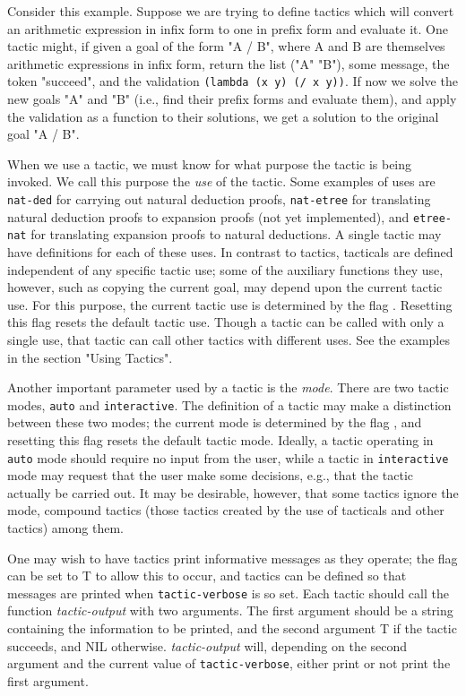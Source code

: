 Consider this example.  Suppose we are trying to define tactics which
will convert an arithmetic expression in infix form to one in
prefix form and evaluate it.  One tactic might,
if given a goal of the form "A / B", where A and B are themselves 
arithmetic expressions in infix form, return the list ("A" "B"),
some message, the token "succeed", and the 
validation {\tt (lambda (x y) (/ x y))}.  If now we solve the new goals "A"
and "B" (i.e., find their prefix forms and evaluate them),
and apply the validation as a function to their solutions, we get
a solution to the original goal "A / B".

When we use a tactic, we must know for what purpose the tactic is being
invoked.  We call this purpose the {\it use} of the tactic.  Some examples
of uses are {\tt nat-ded} for carrying out natural deduction proofs, {\tt nat-etree}
for translating natural deduction proofs to expansion proofs (not yet implemented), and {\tt etree-nat}
for translating expansion proofs to natural deductions.  A single tactic may
have definitions for each of these uses.  In contrast to tactics, tacticals
are defined independent of any specific tactic use; some of the auxiliary
functions they use, however, such as copying the current goal, may depend
upon the current tactic use.  For this purpose, the current tactic use
is determined by the flag .  Resetting this flag resets
the default tactic use. Though a tactic can be called
with only a single use, that tactic can call other tactics with different
uses.  See the examples in the section "Using Tactics".

Another important parameter used by a tactic is the {\it mode}.  There are
two tactic modes, {\tt auto} and {\tt interactive}.  The definition of
a tactic may make a distinction between these two modes; the current
mode is determined by the flag  , and resetting this
flag resets the default tactic mode.  Ideally, a tactic
operating in {\tt auto} mode should require no input from the user, while
a tactic in {\tt interactive} mode may request that the user make some decisions,
e.g., that the tactic actually be carried out.  It may be desirable, however,
that some tactics ignore the mode, compound tactics (those tactics created
by the use of tacticals and other tactics) among them.

One may wish to have tactics print informative messages as they operate;
the flag  can be set to T to allow this to
occur, and tactics can be defined so that messages are printed when
{\tt tactic-verbose} is so set. Each tactic should call the function {\it tactic-output} 
with two arguments. The first argument should be a string containing the information to be
printed, and the second argument T if the tactic succeeds, and NIL
otherwise.  {\it tactic-output} will, depending on the second argument and
the current value of {\tt tactic-verbose}, either print or not print the
first argument.

